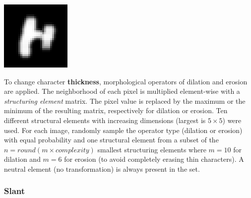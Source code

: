 \documentclass{article} %
\begin{document}
\begin{minipage}[b]{0.14\linewidth}
\begin{center}
\vspace*{-5mm}
\includegraphics[scale=.4]{images/Thick_only.png}\\
\end{center}
\vspace{.6cm}
\end{minipage}%
\hspace{0.3cm}\begin{minipage}[b]{0.86\linewidth}
To change character {\bf thickness}, morphological operators of dilation and erosion~\citep{Haralick87,Serra82}
are applied. The neighborhood of each pixel is multiplied
element-wise with a {\em structuring element} matrix.
The pixel value is replaced by the maximum or the minimum of the resulting
matrix, respectively for dilation or erosion. Ten different structural elements with 
increasing dimensions (largest is $5\times5$) were used.  For each image, 
randomly sample the operator type (dilation or erosion) with equal probability and one structural
element from a subset of the $n=round(m \times complexity)$ smallest structuring elements
where $m=10$ for dilation and $m=6$ for erosion (to avoid completely erasing thin characters).  
A neutral element (no transformation) 
is always present in the set.
\end{minipage}

\vspace{2mm}

\subsubsection*{Slant}
\vspace*{2mm}
\end{document}
